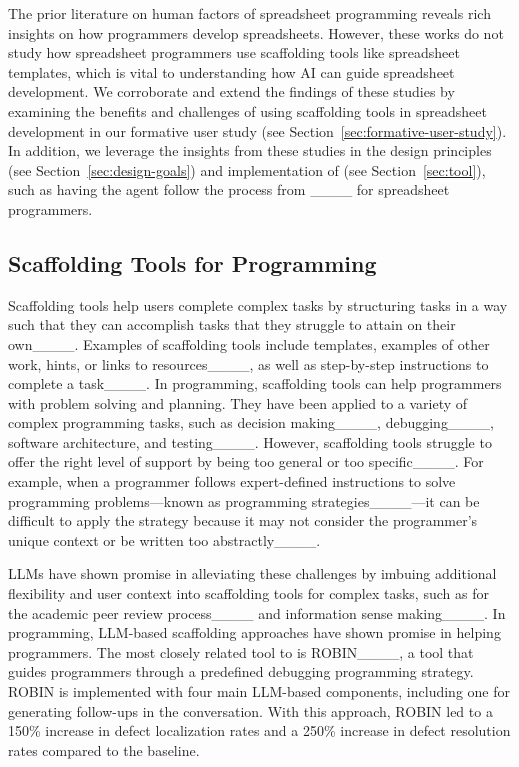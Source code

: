 The prior literature on human factors of spreadsheet programming reveals rich insights on how programmers develop spreadsheets.
However, these works do not study how spreadsheet programmers use scaffolding tools like spreadsheet templates, which is vital to understanding how AI can guide spreadsheet development.
We corroborate and extend the findings of these studies by examining the benefits and challenges of using scaffolding tools in spreadsheet development in our formative user study (see Section~\ref{sec:formative-user-study}).
In addition, we leverage the insights from these studies in the design principles (see Section~\ref{sec:design-goals}) and implementation of \tool (see Section~\ref{sec:tool}),
such as having the agent follow the process from ____ for spreadsheet programmers.

\subsection{Scaffolding Tools for Programming}
\label{sec:scaffolding-processes}
Scaffolding tools help users complete complex tasks by structuring tasks in a way such that they can accomplish tasks that they struggle to attain on their own____.
Examples of scaffolding tools include templates, examples of other work, hints, or links to resources____, as well as step-by-step instructions to complete a task____.
In programming, scaffolding tools can help programmers with problem solving and planning. 
They have been applied to a variety of complex programming tasks, such as decision making____, debugging____, software architecture, and testing____.
However, scaffolding tools struggle to offer the right level of support by being too general or too specific____.
For example, when a programmer follows expert-defined instructions to solve programming problems---known as programming strategies____---it can be difficult to apply the strategy because it may not consider the programmer's unique context or be written too abstractly____.

LLMs have shown promise in alleviating these challenges by imbuing additional flexibility and user context into scaffolding tools for complex tasks, such as for the academic peer review process____ and information sense making____.
In programming, LLM-based scaffolding approaches have shown promise in helping programmers.
The most closely related tool to \tool is ROBIN____, a tool that guides programmers through a predefined debugging programming strategy.
ROBIN is implemented with four main LLM-based components, including one for generating follow-ups in the conversation.
With this approach, ROBIN led to a 150\% increase in defect localization rates and a 250\% increase in defect resolution rates compared to the baseline.

